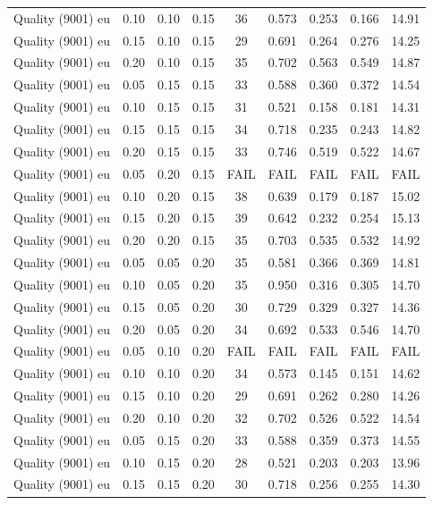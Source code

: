 \begin{longtable}[t]{lrrrccccc}
Quality (9001) eu & 0.10 & 0.10 & 0.15 & 36 & 0.573 & 0.253 & 0.166 & 14.91\\
Quality (9001) eu & 0.15 & 0.10 & 0.15 & 29 & 0.691 & 0.264 & 0.276 & 14.25\\
Quality (9001) eu & 0.20 & 0.10 & 0.15 & 35 & 0.702 & 0.563 & 0.549 & 14.87\\
\addlinespace
Quality (9001) eu & 0.05 & 0.15 & 0.15 & 33 & 0.588 & 0.360 & 0.372 & 14.54\\
Quality (9001) eu & 0.10 & 0.15 & 0.15 & 31 & 0.521 & 0.158 & 0.181 & 14.31\\
Quality (9001) eu & 0.15 & 0.15 & 0.15 & 34 & 0.718 & 0.235 & 0.243 & 14.82\\
Quality (9001) eu & 0.20 & 0.15 & 0.15 & 33 & 0.746 & 0.519 & 0.522 & 14.67\\
Quality (9001) eu & 0.05 & 0.20 & 0.15 & FAIL & FAIL & FAIL & FAIL & FAIL\\
\addlinespace
Quality (9001) eu & 0.10 & 0.20 & 0.15 & 38 & 0.639 & 0.179 & 0.187 & 15.02\\
Quality (9001) eu & 0.15 & 0.20 & 0.15 & 39 & 0.642 & 0.232 & 0.254 & 15.13\\
Quality (9001) eu & 0.20 & 0.20 & 0.15 & 35 & 0.703 & 0.535 & 0.532 & 14.92\\
Quality (9001) eu & 0.05 & 0.05 & 0.20 & 35 & 0.581 & 0.366 & 0.369 & 14.81\\
Quality (9001) eu & 0.10 & 0.05 & 0.20 & 35 & 0.950 & 0.316 & 0.305 & 14.70\\
\addlinespace
Quality (9001) eu & 0.15 & 0.05 & 0.20 & 30 & 0.729 & 0.329 & 0.327 & 14.36\\
Quality (9001) eu & 0.20 & 0.05 & 0.20 & 34 & 0.692 & 0.533 & 0.546 & 14.70\\
Quality (9001) eu & 0.05 & 0.10 & 0.20 & FAIL & FAIL & FAIL & FAIL & FAIL\\
Quality (9001) eu & 0.10 & 0.10 & 0.20 & 34 & 0.573 & 0.145 & 0.151 & 14.62\\
Quality (9001) eu & 0.15 & 0.10 & 0.20 & 29 & 0.691 & 0.262 & 0.280 & 14.26\\
\addlinespace
Quality (9001) eu & 0.20 & 0.10 & 0.20 & 32 & 0.702 & 0.526 & 0.522 & 14.54\\
Quality (9001) eu & 0.05 & 0.15 & 0.20 & 33 & 0.588 & 0.359 & 0.373 & 14.55\\
Quality (9001) eu & 0.10 & 0.15 & 0.20 & 28 & 0.521 & 0.203 & 0.203 & 13.96\\
Quality (9001) eu & 0.15 & 0.15 & 0.20 & 30 & 0.718 & 0.256 & 0.255 & 14.30\\

\end{longtable}

